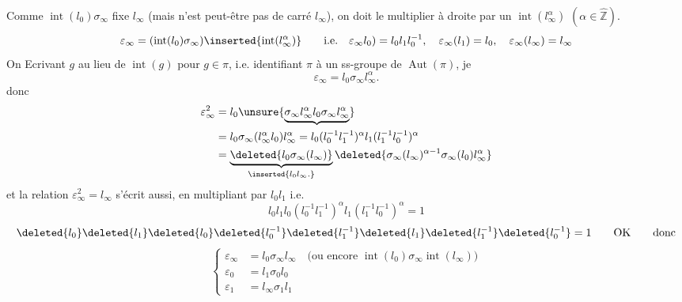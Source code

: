 Comme $\operatorname{int}(l_0)\sigma_\infty$ fixe $l_\infty$ (mais n'est peut-être pas de carré $l_\infty$), on doit le multiplier à droite par un $\operatorname{int}(l_\infty^\alpha)$ $(\alpha\in\widehat{\mathbb Z})$.
\deleted{\[
\varepsilon_\infty(l_\infty)=l_\infty,\qquad\varepsilon_\infty(l_0)=
\]}
\[
\varepsilon_\infty=(\operatorname{int}(l_0)\sigma_\infty)\inserted{\operatorname{int}(l_\infty^\alpha)}\qquad\text{i.e.}\quad
\varepsilon_\infty l_0)=l_0l_1l_0^{-1},\quad\varepsilon_\infty(l_1)=l_0,\quad\varepsilon_\infty(l_\infty)=l_\infty
\]
On   Ecrivant $g$ au lieu de $\operatorname{int}(g)$ pour $g\in\pi$, i.e. identifiant $\pi$ à un ss-groupe de $\operatorname{Aut}(\pi)$, je  
\[
\varepsilon_\infty=l_0\sigma_\infty l_\infty^\alpha.
\]
\deleted{\[
\varepsilon_\infty^2=l_0\sigma_\infty l_0\sigma_\infty
=l_0\sigma_\infty l_0\sigma_\infty^{-1}=l_0\sigma_\infty(l_0)
\]}
donc
\[
\begin{aligned}
\varepsilon_\infty^2&=l_0\unsure{\underbrace{\sigma_\infty l_\infty^\alpha l_0\sigma_\infty l_\infty^\alpha}}\\
&=l_0\sigma_\infty(l_\infty^\alpha l_0)l_\infty^\alpha
=l_0(l_0^{-1}l_1^{-1})^\alpha l_1(l_1^{-1}l_0^{-1})^\alpha\\
&=\underbrace{\deleted{l_0\sigma_\infty(l_\infty)}}_{\inserted{l_0l_\infty.}}\deleted{\sigma_\infty(l_\infty)^{\alpha-1}\sigma_\infty(l_0)l_\infty^\alpha}
\end{aligned}
\]
et la relation $\varepsilon_\infty^2=l_\infty$  s'écrit aussi, en multipliant par $l_0l_1$
\deleted{\[
l_0l_\infty\underbrace{\sigma_\infty(l_\infty)^{\alpha-1}}_{(l_0^{-1}l_1^{-1})^{\alpha-1}}\underbrace{\sigma_\infty(l_0)}_{l_1}l_\infty^{\alpha-1}=1
\]}
i.e.
\deleted{\[
\deleted{\unsure{l_\infty^{-1}l_\infty}}l_0^{1-\alpha}l_1^{2-\alpha}l_\infty^\alpha=1
\]}
\[
l_0l_1l_0(l_0^{-1}l_1^{-1})^\alpha l_1(l_1^{-1}l_0^{-1})^\alpha=1
\]
\deleted{\[
l_0l_1l_0l_0^{-1}l_1^{-1}l_0^{-1}l_1^{-1}l_1l_1^{-1}l_0^{-1}l_1^{-1}l_0^{-1}=1?\qquad\text{Non !}
\]}
\[
\deleted{l_0}\deleted{l_1}\deleted{l_0}\deleted{l_0^{-1}}\deleted{l_1^{-1}}\deleted{l_1}\deleted{l_1^{-1}}\deleted{l_0^{-1}}=1
\qquad\text{OK}\qquad\text{donc}
\]
\[
\left\{\begin{aligned}
\varepsilon_\infty&=l_0\sigma_\infty l_\infty\quad\text{(ou encore }\operatorname{int}(l_0)\sigma_\infty\operatorname{int}(l_\infty)\text{)}\\
\varepsilon_0&=l_1\sigma_0l_0\\
\varepsilon_1&=l_\infty\sigma_1l_1
\end{aligned}\right.
\]

